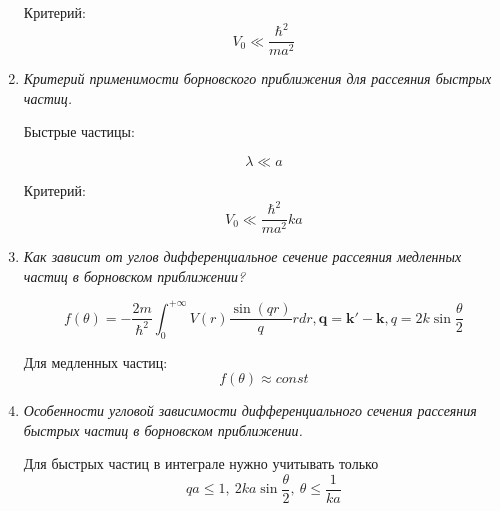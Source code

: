 \documentclass{article}
\begin{document}
\begin{enumerate}
		Критерий:
		\begin{equation}
			V_{0}\ll\frac{\hbar^{2}}{ma^{2}}
		\end{equation}
		
		\item \textit{Критерий применимости борновского приближения для рассеяния быстрых частиц.}
		
		Быстрые частицы:
		
		\begin{equation}
			\lambda\ll a
		\end{equation}
		
		Критерий:
		\begin{equation}
			V_{0}\ll\frac{\hbar^{2}}{ma^{2}}ka
		\end{equation}
		
		\item \textit{Как зависит от углов дифференциальное сечение рассеяния медленных частиц в борновском приближении?}
		
		\begin{equation}
			f(\theta)=-\frac{2m}{\hbar^{2}}\int_{0}^{+\infty}V(r)\frac{\sin(qr)}{q}rdr,\boldsymbol{q=k'-k},q=2k\sin\frac{\theta}{2}
		\end{equation}
		
		Для медленных частиц:
		\begin{equation}
			f(\theta)\approx const
		\end{equation}
		
		\item \textit{ Особенности угловой зависимости дифференциального сечения рассеяния быстрых частиц в борновском приближении.}
		
		Для быстрых частиц в интеграле нужно учитывать только
		\begin{equation}
			qa\leq1, \ 2ka\sin\frac{\theta}{2},\ \theta\leq\frac{1}{ka}
		\end{equation}
		
	\end{enumerate}
	
	
{}
\end{document}
